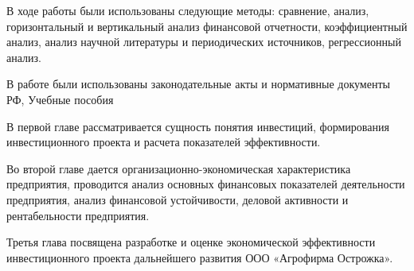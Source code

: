 В ходе работы были использованы следующие методы: сравнение, анализ, горизонтальный и вертикальный анализ финансовой отчетности, коэффициентный анализ, анализ научной литературы и периодических источников, регрессионный анализ.

В работе были использованы законодательные акты и нормативные документы РФ, Учебные пособия 

В первой главе рассматривается сущность понятия инвестиций, формирования инвестиционного проекта и расчета показателей эффективности.

Во второй главе дается организационно-экономическая характеристика предприятия, проводится анализ основных финансовых показателей деятельности предприятия, анализ финансовой устойчивости, деловой активности и рентабельности предприятия.

Третья глава посвящена разработке и оценке экономической эффективности инвестиционного проекта дальнейшего развития ООО «Агрофирма Острожка».
